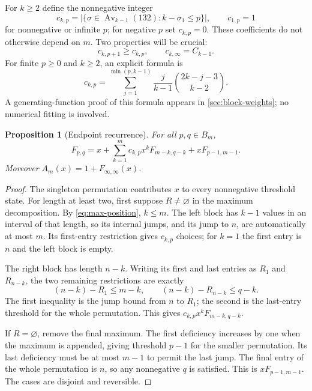 \documentclass[11pt,a4paper]{article}
\newtheorem{proposition}[proposition]{Proposition}
\theoremstyle{definition}\newaliascnt{definition}{theorem}
\theoremstyle{remark}\newaliascnt{remark}{theorem}
\newcommand{\Av}{\operatorname{Av}}
\begin{document}
For $k\ge2$ define the nonnegative integer
\begin{equation}
 c_{k,p}=\bigl|\{\sigma\in\Av_{k-1}(132):k-\sigma_1\le p\}\bigr|,
 \qquad c_{1,p}=1
 \label{eq:c-def}
\end{equation}
for nonnegative or infinite $p$; for negative $p$ set $c_{k,p}=0$.
These coefficients do not otherwise depend on $m$. Two properties will be
crucial:
\begin{equation}
 c_{k,p+1}\ge c_{k,p},\qquad c_{k,\infty}=C_{k-1}.
 \label{eq:c-monotone}
\end{equation}
For finite $p\ge0$ and $k\ge2$, an explicit formula is
\begin{equation}
 c_{k,p}=\sum_{j=1}^{\min(p,k-1)}
 \frac{j}{k-1}\binom{2k-j-3}{k-2}.
 \label{eq:c-formula}
\end{equation}
A generating-function proof of this formula appears in
\cref{sec:block-weights}; no numerical fitting is involved.

\begin{proposition}[Endpoint recurrence]\label{prop:endpoint}
For all $p,q\in B_m$,
\begin{equation}
 F_{p,q}=x+\sum_{k=1}^m c_{k,p}x^kF_{m-k,q-k}
                   +xF_{p-1,m-1}.
 \label{eq:endpoint}
\end{equation}
Moreover $A_m(x)=1+F_{\infty,\infty}(x)$.
\end{proposition}
\begin{proof}
The singleton permutation contributes $x$ to every nonnegative threshold
state. For length at least two, first suppose $R\ne\varnothing$ in the
maximum decomposition. By \eqref{eq:max-position}, $k\le m$.
The left block has $k-1$ values in an interval of that length, so its internal
jumps, and its jump to $n$, are automatically at most $m$. Its first-entry
restriction gives $c_{k,p}$ choices; for $k=1$ the first entry is $n$ and the
left block is empty.

The right block has length $n-k$. Writing its first and last entries as
$R_1$ and $R_{n-k}$, the two remaining restrictions are exactly
\[
 (n-k)-R_1\le m-k,\qquad
 (n-k)-R_{n-k}\le q-k.
\]
The first inequality is the jump bound from $n$ to $R_1$; the second is the
last-entry threshold for the whole permutation. This gives
$c_{k,p}x^kF_{m-k,q-k}$.

If $R=\varnothing$, remove the final maximum. The first deficiency increases
by one when the maximum is appended, giving threshold $p-1$ for the smaller
permutation. Its last deficiency must be at most $m-1$ to permit the last
jump. The final entry of the whole permutation is $n$, so any nonnegative
$q$ is satisfied. This is $xF_{p-1,m-1}$. The cases are disjoint and reversible.
\end{proof}
\end{document}
